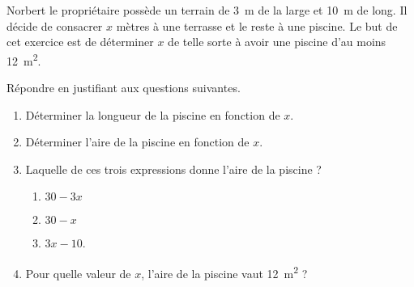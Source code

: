
\begin{exercice}\label{exosmath-0965}

    Norbert le propriétaire possède un terrain de \SI{3}{\meter} de la large et \SI{10}{\meter} de long. Il décide de consacrer \( x\) mètres à une terrasse et le reste à une piscine. Le but de cet exercice est de déterminer \( x\) de telle sorte à avoir une piscine d'au moins \SI{12}{\meter\squared}.

\begin{center}
   
\end{center}

Répondre en justifiant aux questions suivantes.
\begin{enumerate}
    \item
        Déterminer la longueur de la piscine en fonction de \( x\).
    \item
        Déterminer l'aire de la piscine en fonction de \( x\).
    \item
        Laquelle de ces trois expressions donne l'aire de la piscine ?
        \begin{enumerate}
            \item
                \( 30-3x\)
            \item
                \( 30-x\)
            \item
                \( 3x-10\).
        \end{enumerate}
    \item
        Pour quelle valeur de \( x\), l'aire de la piscine vaut \SI{12}{\meter\squared} ?
\end{enumerate}

\end{exercice}
